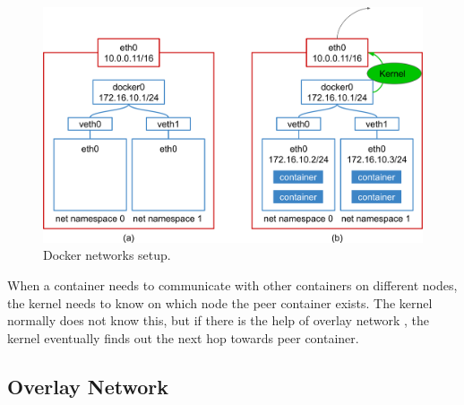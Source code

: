 \begin{figure}[h]
  \centering
  \includegraphics[width=0.95\columnwidth]{Figs/bridge+veth}

  \par\bigskip
  \centering
  \begin{minipage}{0.9\columnwidth}
    \caption[Docker networks setup]{
      Docker networks setup.
    }
    \label{fig:bridge+veth}
  \end{minipage}
\end{figure}
 
When a container needs to communicate with other containers on different nodes, the kernel needs to know on which node the peer container exists.
The kernel normally does not know this, but if there is the help of overlay network \cite{zismer2016performance}, the kernel eventually finds out the next hop towards peer container.

\FloatBarrier

\subsection{Overlay Network}


